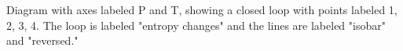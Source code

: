 Diagram with axes labeled P and T, showing a closed loop with points labeled 1, 2, 3, 4. The loop is labeled "entropy changes" and the lines are labeled "isobar" and "reversed."